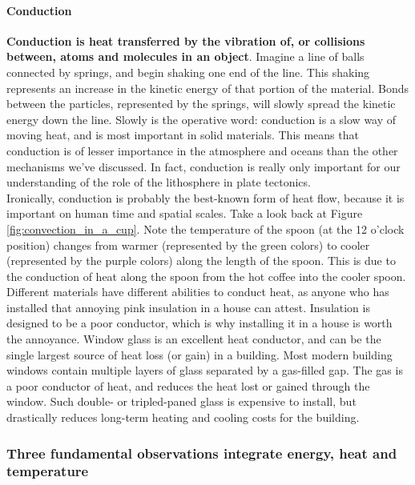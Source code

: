 \paragraph{Conduction}
\textbf{Conduction is heat transferred by the vibration of, or collisions between, atoms and molecules in an object}. Imagine a line of balls connected by springs, and begin shaking one end of the line. This shaking represents an increase in the kinetic energy of that portion of the material. Bonds between the particles, represented by the springs, will slowly spread the kinetic energy down the line. Slowly is the operative word: conduction is a slow way of moving heat, and is most important in solid materials. This means that conduction is of lesser importance in the atmosphere and oceans than the other mechanisms we've discussed. In fact, conduction is really only important for our understanding of the role of the lithosphere in plate tectonics.\\

Ironically, conduction is probably the best-known form of heat flow, because it is important on human time and spatial scales. Take a look back at Figure \ref{fig:convection_in_a_cup}. Note the temperature of the spoon (at the 12 o'clock position) changes from warmer (represented by the green colors) to cooler (represented by the purple colors) along the length of the spoon. This is due to the conduction of heat along the spoon from the hot coffee into the cooler spoon. Different materials have different abilities to conduct heat, as anyone who has installed that annoying pink insulation in a house can attest. Insulation is designed to be a poor conductor, which is why installing it in a house is worth the annoyance. Window glass is an excellent heat conductor, and can be the single largest source of heat loss (or gain) in a building. Most modern building windows contain multiple layers of glass separated by a gas-filled gap. The gas is a poor conductor of heat, and reduces the heat lost or gained through the window. Such double- or tripled-paned glass is expensive to install, but drastically reduces long-term heating and cooling costs for the building.

\subsubsection{Three fundamental observations integrate energy, heat and temperature}
